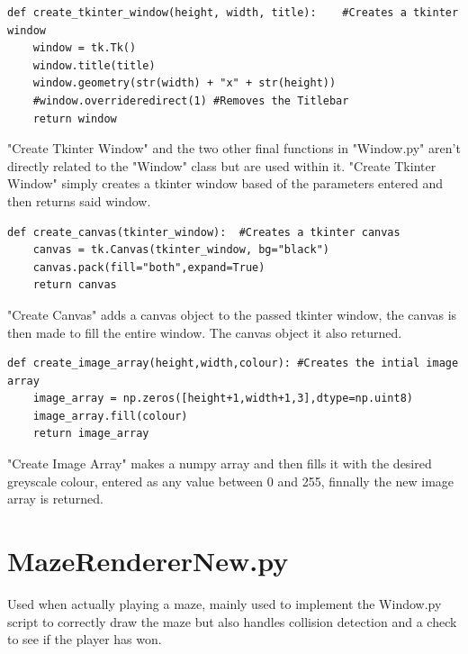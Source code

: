 \documentclass{article}
\begin{document}
\begin{lstlisting}
def create_tkinter_window(height, width, title):    #Creates a tkinter window
    window = tk.Tk()
    window.title(title)
    window.geometry(str(width) + "x" + str(height))
    #window.overrideredirect(1) #Removes the Titlebar
    return window
\end{lstlisting}
"Create Tkinter Window" and the two other final functions in "Window.py" aren't directly related to the "Window" class but are used within it. "Create Tkinter Window" simply creates
a tkinter window based of the parameters entered and then returns said window.
\begin{lstlisting}
def create_canvas(tkinter_window):  #Creates a tkinter canvas
    canvas = tk.Canvas(tkinter_window, bg="black")
    canvas.pack(fill="both",expand=True)
    return canvas
\end{lstlisting}
"Create Canvas" adds a canvas object to the passed tkinter window, the canvas is then made to fill the entire window. The canvas object it also returned.
\begin{lstlisting}
def create_image_array(height,width,colour): #Creates the intial image array
    image_array = np.zeros([height+1,width+1,3],dtype=np.uint8)
    image_array.fill(colour)
    return image_array
\end{lstlisting}
"Create Image Array" makes a numpy array and then fills it with the desired greyscale colour, entered as any value between 0 and 255, finnally the new image
array is returned.

\clearpage
\section{MazeRendererNew.py}
Used when actually playing a maze, mainly used to implement the Window.py script to correctly draw the maze but also handles collision detection and a check to see if the player has won.
\end{document}
